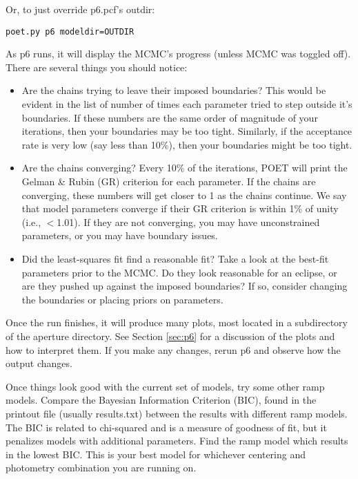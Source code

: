 \documentclass[letterpaper,12pt]{article}
\begin{document}
Or, to just override p6.pcf's outdir:

\begin{verbatim}
poet.py p6 modeldir=OUTDIR
\end{verbatim}

As p6 runs, it will display the MCMC's progress (unless MCMC was
toggled off). There are several things you should notice:

\begin{itemize}
\item Are the chains trying to leave their imposed boundaries? This would
  be evident in the list of number of times each parameter tried to step
  outside it's boundaries. If these numbers are the same order of magnitude
  of your iterations, then your boundaries may be too tight. Similarly,
  if the acceptance rate is very low (say less than 10\%), then your
  boundaries might be too tight.

\item Are the chains converging? Every 10\% of the iterations, POET
  will print the Gelman \& Rubin (GR) criterion for each parameter. If
  the chains are converging, these numbers will get closer to 1 as the
  chains continue. We say that model parameters converge if their GR
  criterion is within 1\% of unity (i.e., $<$1.01). If they are not
  converging, you may have unconstrained parameters, or you may have
  boundary issues.

\item Did the least-squares fit find a reasonable fit? Take a look at the
  best-fit parameters prior to the MCMC. Do they look reasonable for an
  eclipse, or are they pushed up against the imposed boundaries? If so,
  consider changing the boundaries or placing priors on parameters.

\end{itemize}

Once the run finishes, it will produce many plots, most located in a
subdirectory of the aperture directory. See Section \ref{sec:p6} for a
discussion of the plots and how to interpret them. If you make any
changes, rerun p6 and observe how the output changes.

Once things look good with the current set of models, try some other
ramp models. Compare the Bayesian Information Criterion (BIC), found
in the printout file (usually results.txt) between the results with
different ramp models. The BIC is related to chi-squared and is a
measure of goodness of fit, but it penalizes models with additional
parameters.  Find the ramp model which results in the lowest BIC. This
is your best model for whichever centering and photometry combination
you are running on.
\end{document}
